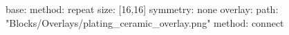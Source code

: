 base:
  method: repeat
  size: [16,16]
  symmetry: none
overlay:
  path: "Blocks/Overlays/plating_ceramic_overlay.png"
  method: connect